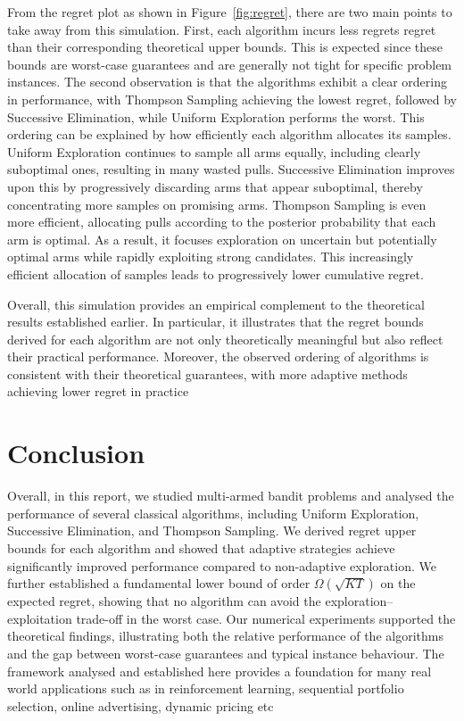 \documentclass[12pt]{article}
\begin{document}
From the regret plot as shown in Figure~\ref{fig:regret}, there are two main points to take away from this simulation. First, each algorithm incurs less regrets regret than their corresponding theoretical upper bounds. This is expected since these bounds are worst-case guarantees and are generally not tight for specific problem instances. The second observation is that the algorithms exhibit a clear ordering in performance, with Thompson Sampling achieving the lowest regret, followed by Successive Elimination, while Uniform Exploration performs the worst. This ordering can be explained by how efficiently each algorithm allocates its samples. Uniform Exploration continues to sample all arms equally, including clearly suboptimal ones, resulting in many wasted pulls. Successive Elimination improves upon this by progressively discarding arms that appear suboptimal, thereby concentrating more samples on promising arms. Thompson Sampling is even more efficient, allocating pulls according to the posterior probability that each arm is optimal. As a result, it focuses exploration on uncertain but potentially optimal arms while rapidly exploiting strong candidates. This increasingly efficient allocation of samples leads to progressively lower cumulative regret. 

Overall, this simulation provides an empirical complement to the theoretical results established earlier. In particular, it illustrates that the regret bounds derived for each algorithm are not only theoretically meaningful but also reflect their practical performance. Moreover, the observed ordering of algorithms is consistent with their theoretical guarantees, with more adaptive methods achieving lower regret in practice

\section{Conclusion}

Overall, in this report, we studied multi-armed bandit problems and analysed the performance of several classical algorithms, including Uniform Exploration, Successive Elimination, and Thompson Sampling. We derived regret upper bounds for each algorithm and showed that adaptive strategies achieve significantly improved performance compared to non-adaptive exploration. We further established a fundamental lower bound of order $\Omega(\sqrt{KT})$ on the expected regret, showing that no algorithm can avoid the exploration–exploitation trade-off in the worst case. Our numerical experiments supported the theoretical findings, illustrating both the relative performance of the algorithms and the gap between worst-case guarantees and typical instance behaviour. The framework analysed and established here provides a foundation for many real world applications such as in reinforcement learning, sequential portfolio selection, online advertising, dynamic pricing etc \cite{DBLP:journals/corr/abs-1904-10040}
\end{document}
